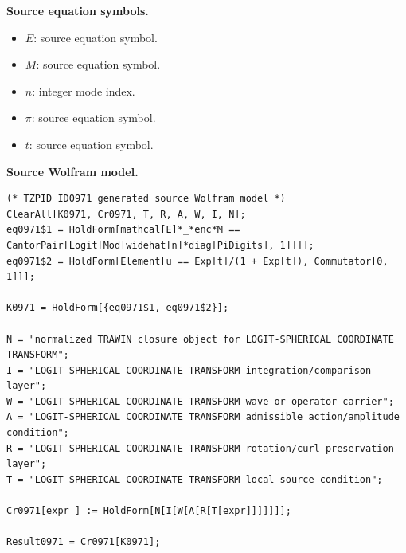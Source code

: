 \begin{minipage}[t]{0.49\linewidth}
\begingroup
\small
\raggedright
\textbf{Source equation symbols.}\par
\begin{itemize}[leftmargin=1.35em,itemsep=1pt,topsep=1pt,parsep=0pt]
    \item $E$: source equation symbol.
    \item $M$: source equation symbol.
    \item $n$: integer mode index.
    \item $\pi$: source equation symbol.
    \item $t$: source equation symbol.
\end{itemize}
\endgroup
\end{minipage}\hfill
\begin{minipage}[t]{0.47\linewidth}
\begingroup
\scriptsize
\raggedright
\textbf{Source Wolfram model.}\par
\begin{Verbatim}[fontsize=\tiny,breaklines=true,breakanywhere=true]
(* TZPID ID0971 generated source Wolfram model *)
ClearAll[K0971, Cr0971, T, R, A, W, I, N];
eq0971$1 = HoldForm[mathcal[E]*_*enc*M == CantorPair[Logit[Mod[widehat[n]*diag[PiDigits], 1]]]];
eq0971$2 = HoldForm[Element[u == Exp[t]/(1 + Exp[t]), Commutator[0, 1]]];

K0971 = HoldForm[{eq0971$1, eq0971$2}];

N = "normalized TRAWIN closure object for LOGIT-SPHERICAL COORDINATE TRANSFORM";
I = "LOGIT-SPHERICAL COORDINATE TRANSFORM integration/comparison layer";
W = "LOGIT-SPHERICAL COORDINATE TRANSFORM wave or operator carrier";
A = "LOGIT-SPHERICAL COORDINATE TRANSFORM admissible action/amplitude condition";
R = "LOGIT-SPHERICAL COORDINATE TRANSFORM rotation/curl preservation layer";
T = "LOGIT-SPHERICAL COORDINATE TRANSFORM local source condition";

Cr0971[expr_] := HoldForm[N[I[W[A[R[T[expr]]]]]]];

Result0971 = Cr0971[K0971];
\end{Verbatim}
\endgroup
\end{minipage}

